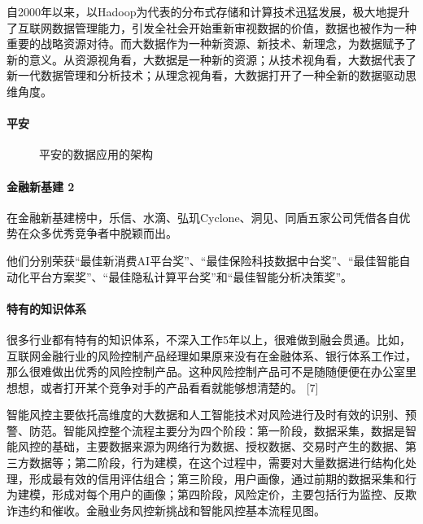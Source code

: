 \documentclass[letterpaper,10pt,english]{sphinxmanual}
\begin{document}
自2000年以来，以Hadoop为代表的分布式存储和计算技术迅猛发展，极大地提升了互联网数据管理能力，引发全社会开始重新审视数据的价值，数据也被作为一种重要的战略资源对待。而大数据作为一种新资源、新技术、新理念，为数据赋予了新的意义。从资源视角看，大数据是一种新的资源；从技术视角看，大数据代表了新一代数据管理和分析技术；从理念视角看，大数据打开了一种全新的数据驱动思维角度。


\paragraph{平安}
\label{\detokenize{chapter_project/AI_Finance:id9}}
\begin{figure}[H]
\centering
\capstart

\noindent{}
\caption{平安的数据应用的架构}\label{\detokenize{chapter_project/AI_Finance:id35}}\end{figure}


\paragraph{金融新基建 2\sphinxfootnotemark[754]}
\label{\detokenize{chapter_project/AI_Finance:id10}}%
\begin{footnotetext}[754]\sphinxAtStartFootnote
{}
%
\end{footnotetext}\ignorespaces 
在金融新基建榜中，乐信、水滴、弘玑Cyclone、洞见、同盾五家公司凭借各自优势在众多优秀竞争者中脱颖而出。

他们分别荣获“最佳新消费AI平台奖”、“最佳保险科技数据中台奖”、“最佳智能自动化平台方案奖”、“最佳隐私计算平台奖”和“最佳智能分析决策奖”。


\paragraph{特有的知识体系}
\label{\detokenize{chapter_project/AI_Finance:id11}}
很多行业都有特有的知识体系，不深入工作5年以上，很难做到融会贯通。比如，互联网金融行业的风险控制产品经理如果原来没有在金融体系、银行体系工作过，那么很难做出优秀的风险控制产品。这种风险控制产品可不是随随便便在办公室里想想，或者打开某个竞争对手的产品看看就能够想清楚的。
{[}7{]}

智能风控主要依托高维度的大数据和人工智能技术对风险进行及时有效的识别、预警、防范。智能风控整个流程主要分为四个阶段：第一阶段，数据采集，数据是智能风控的基础，主要数据来源为网络行为数据、授权数据、交易时产生的数据、第三方数据等；第二阶段，行为建模，在这个过程中，需要对大量数据进行结构化处理，形成最有效的信用评估组合；第三阶段，用户画像，通过前期的数据采集和行为建模，形成对每个用户的画像；第四阶段，风险定价，主要包括行为监控、反欺诈违约和催收。金融业务风控新挑战和智能风控基本流程见图。
\end{document}
